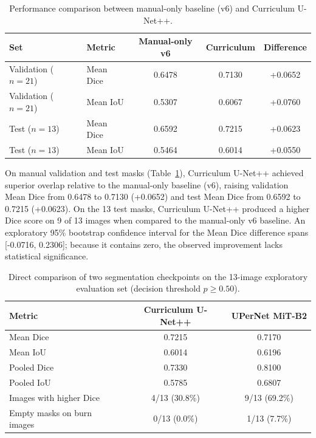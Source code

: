 \documentclass[11pt,a4paper]{article}
\begin{document}
\begin{table}[htbp]
\centering
\caption{Performance comparison between manual-only baseline (v6) and Curriculum U-Net++.}
\label{tab:table7}
\small
\begin{tabular}{llccc}
\toprule
\textbf{Set} & \textbf{Metric} & \textbf{Manual-only v6} & \textbf{Curriculum} & \textbf{Difference} \\
\midrule
Validation ($n = 21$) & Mean Dice & 0.6478 & 0.7130 & +0.0652 \\
Validation ($n = 21$) & Mean IoU  & 0.5307 & 0.6067 & +0.0760 \\
Test ($n = 13$)       & Mean Dice & 0.6592 & 0.7215 & +0.0623 \\
Test ($n = 13$)       & Mean IoU  & 0.5464 & 0.6014 & +0.0550 \\
\bottomrule
\end{tabular}
\end{table}

On manual validation and test masks (Table~\ref{tab:table7}), Curriculum U-Net++ achieved superior overlap relative to the manual-only baseline (v6), raising validation Mean Dice from 0.6478 to 0.7130 (+0.0652) and test Mean Dice from 0.6592 to 0.7215 (+0.0623). On the 13 test masks, Curriculum U-Net++ produced a higher Dice score on 9 of 13 images when compared to the manual-only v6 baseline. An exploratory 95\% bootstrap confidence interval for the Mean Dice difference spans [-0.0716, 0.2306]; because it contains zero, the observed improvement lacks statistical significance.

\begin{table}[htbp]
\centering
\caption{Direct comparison of two segmentation checkpoints on the 13-image exploratory evaluation set (decision threshold $p \ge 0.50$).}
\label{tab:table8}
\small
\begin{tabular}{lcc}
\toprule
\textbf{Metric} & \textbf{Curriculum U-Net++} & \textbf{UPerNet MiT-B2} \\
\midrule
Mean Dice                     & 0.7215          & 0.7170          \\
Mean IoU                      & 0.6014          & 0.6196          \\
Pooled Dice                   & 0.7330          & 0.8100          \\
Pooled IoU                    & 0.5785          & 0.6807          \\
Images with higher Dice       & 4/13 (30.8\%)   & 9/13 (69.2\%)   \\
Empty masks on burn images    & 0/13 (0.0\%)    & 1/13 (7.7\%)    \\
\bottomrule
\end{tabular}
\end{table}
\end{document}
